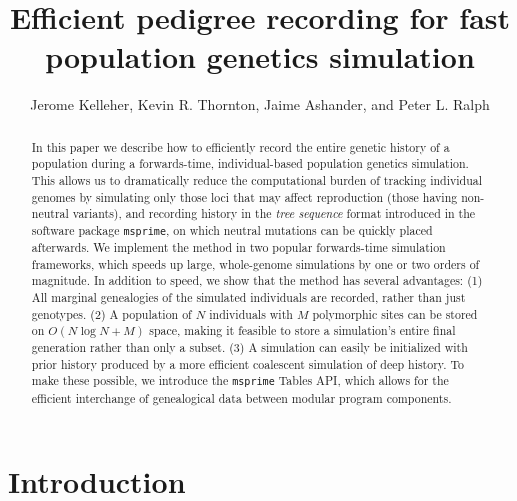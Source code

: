 \documentclass{article}
\newcommand{\msprime}{\texttt{msprime}}
\begin{document}
\title{Efficient pedigree recording for fast population genetics simulation}
\author{Jerome Kelleher,
        Kevin R. Thornton,
        Jaime Ashander, and
        Peter L. Ralph}
\maketitle



\begin{abstract}
    In this paper we describe how to
    efficiently record the entire genetic history of a population
    during a forwards-time, individual-based population genetics simulation.
    This allows us to dramatically reduce the computational burden of tracking individual genomes
    by simulating only those loci that may affect reproduction (those having non-neutral variants),
    and recording history in the \emph{tree sequence} format introduced in the software package \msprime,
    on which neutral mutations can be quickly placed afterwards.
    We implement the method in two popular forwards-time simulation frameworks,
    which speeds up large, whole-genome simulations by one or two orders of magnitude.
    In addition to speed, we show that the method has several advantages:
    (1) All marginal genealogies of the simulated individuals are recorded, rather than just genotypes.
    (2) A population of $N$ individuals with $M$ polymorphic sites
    can be stored on $O(N \log N + M)$ space, making it feasible to store a simulation's entire final generation
    rather than only a subset.
    (3) A simulation can easily be initialized with prior history produced by a more efficient coalescent simulation of deep history.
    To make these possible, 
    we introduce the \msprime{} Tables API, which allows for the efficient interchange of genealogical data between modular program components.
\end{abstract}



\section*{Introduction}
\end{document}
